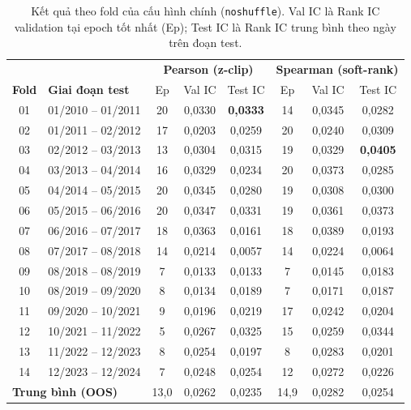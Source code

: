 \documentclass[a4paper,12pt]{article}
\begin{document}
\begin{table}[H]\centering\small
\caption[Kết quả theo fold (Gate + No-Shuffle)]{Kết quả theo fold của cấu hình chính (\texttt{noshuffle}). Val IC là Rank IC validation tại epoch tốt nhất (Ep); Test IC là Rank IC trung bình theo ngày trên đoạn test.}
\label{tab:fold}
\renewcommand{\arraystretch}{1.12}
\begin{tabular}{@{}cl|ccc|ccc@{}}
\toprule
& & \multicolumn{3}{c|}{\textbf{Pearson (z-clip)}} & \multicolumn{3}{c}{\textbf{Spearman (soft-rank)}}\\
\textbf{Fold} & \textbf{Giai đoạn test} & Ep & Val IC & Test IC & Ep & Val IC & Test IC\\\midrule
01 & 01/2010 -- 01/2011 & 20 & 0,0330 & \textbf{0,0333} & 14 & 0,0345 & 0,0282\\
02 & 01/2011 -- 02/2012 & 17 & 0,0203 & 0,0259 & 20 & 0,0240 & 0,0309\\
03 & 02/2012 -- 03/2013 & 13 & 0,0304 & 0,0315 & 19 & 0,0329 & \textbf{0,0405}\\
04 & 03/2013 -- 04/2014 & 16 & 0,0329 & 0,0234 & 20 & 0,0373 & 0,0285\\
05 & 04/2014 -- 05/2015 & 20 & 0,0345 & 0,0280 & 19 & 0,0308 & 0,0300\\
06 & 05/2015 -- 06/2016 & 20 & 0,0347 & 0,0331 & 19 & 0,0361 & 0,0373\\
07 & 06/2016 -- 07/2017 & 18 & 0,0363 & 0,0161 & 18 & 0,0389 & 0,0193\\
08 & 07/2017 -- 08/2018 & 14 & 0,0214 & 0,0057 & 14 & 0,0224 & 0,0064\\
09 & 08/2018 -- 08/2019 & 7 & 0,0133 & 0,0133 & 7 & 0,0145 & 0,0183\\
10 & 08/2019 -- 09/2020 & 8 & 0,0134 & 0,0189 & 7 & 0,0171 & 0,0187\\
11 & 09/2020 -- 10/2021 & 9 & 0,0196 & 0,0219 & 17 & 0,0242 & 0,0204\\
12 & 10/2021 -- 11/2022 & 5 & 0,0267 & 0,0325 & 15 & 0,0259 & 0,0344\\
13 & 11/2022 -- 12/2023 & 8 & 0,0254 & 0,0197 & 8 & 0,0283 & 0,0201\\
14 & 12/2023 -- 12/2024 & 7 & 0,0248 & 0,0254 & 12 & 0,0272 & 0,0226\\\midrule
\multicolumn{2}{l|}{\textbf{Trung bình (OOS)}} & 13,0 & 0,0262 & 0,0235 & 14,9 & 0,0282 & 0,0254\\
\bottomrule
\end{tabular}
\end{table}
\end{document}
